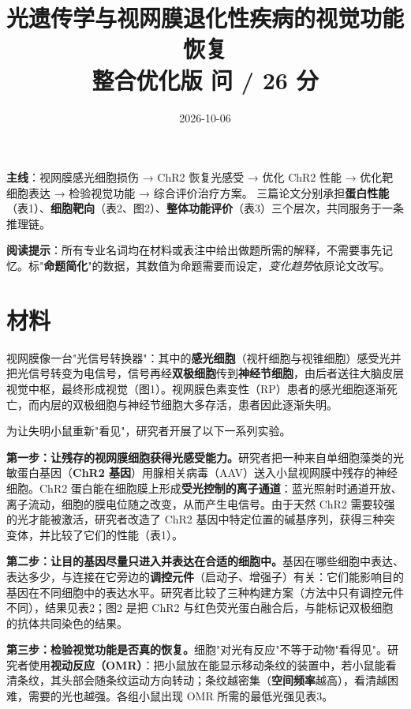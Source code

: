 \documentclass[UTF8,a4paper,11pt]{ctexart}
\title{\bfseries 光遗传学与视网膜退化性疾病的视觉功能恢复\\[5pt]
\large 整合优化版\quad 9 问 / 26 分}
\author{}\date{2026-10-06}
\newcommand{\key}[1]{\textbf{\color{deepred}#1}}
\begin{document}
\maketitle
\thispagestyle{fancy}

\noindent\textbf{主线}：视网膜感光细胞损伤 → ChR2 恢复光感受 → 优化 ChR2 性能 → 优化靶细胞表达 → 检验视觉功能 → 综合评价治疗方案。
三篇论文分别承担\textbf{蛋白性能}（表1）、\textbf{细胞靶向}（表2、图2）、\textbf{整体功能评价}（表3）三个层次，共同服务于一条推理链。

\vspace{4pt}
\noindent\textbf{阅读提示}：所有专业名词均在材料或表注中给出做题所需的解释，不需要事先记忆。标"\key{命题简化}"的数据，其数值为命题需要而设定，\emph{变化趋势}依原论文改写。

\section{材料}

视网膜像一台"光信号转换器"：其中的\textbf{感光细胞}（视杆细胞与视锥细胞）感受光并把光信号转变为电信号，信号再经\textbf{双极细胞}传到\textbf{神经节细胞}，由后者送往大脑皮层视觉中枢，最终形成视觉（图1）。视网膜色素变性（RP）患者的感光细胞逐渐死亡，而内层的双极细胞与神经节细胞大多存活，患者因此逐渐失明。

为让失明小鼠重新"看见"，研究者开展了以下一系列实验。

\textbf{第一步：让残存的视网膜细胞获得光感受能力。}研究者把一种来自单细胞藻类的光敏蛋白基因（\textbf{ChR2 基因}）用腺相关病毒（AAV）送入小鼠视网膜中残存的神经细胞。ChR2 蛋白能在细胞膜上形成\textbf{受光控制的离子通道}：蓝光照射时通道开放、离子流动，细胞的膜电位随之改变，从而产生电信号。由于天然 ChR2 需要较强的光才能被激活，研究者改造了 ChR2 基因中特定位置的碱基序列，获得三种突变体，并比较了它们的性能（表1）。

\textbf{第二步：让目的基因尽量只进入并表达在合适的细胞中。}基因在哪些细胞中表达、表达多少，与连接在它旁边的\textbf{调控元件}（启动子、增强子）有关：它们能影响目的基因在不同细胞中的表达水平。研究者比较了三种构建方案（方法中只有调控元件不同），结果见表2；图2 是把 ChR2 与红色荧光蛋白融合后，与能标记双极细胞的抗体共同染色的结果。

\textbf{第三步：检验视觉功能是否真的恢复。}细胞"对光有反应"不等于动物"看得见"。研究者使用\textbf{视动反应（OMR）}：把小鼠放在能显示移动条纹的装置中，若小鼠能看清条纹，其头部会随条纹运动方向转动；条纹越密集（\textbf{空间频率}越高），看清越困难，需要的光也越强。各组小鼠出现 OMR 所需的最低光强见表3。
\end{document}
